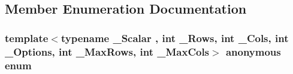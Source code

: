 \subsection{Member Enumeration Documentation}
\hypertarget{structei__traits_3_01_matrix_3_01___scalar_00_01___rows_00_01___cols_00_01___options_00_01___max42eca4acfde64c6129563dd143e7773e_abd2f016cad615ecfde4130fcf6345cf8}{\subsubsection[{anonymous enum}]{\setlength{\rightskip}{0pt plus 5cm}template$<$typename \-\_\-\-Scalar , int \-\_\-\-Rows, int \-\_\-\-Cols, int \-\_\-\-Options, int \-\_\-\-Max\-Rows, int \-\_\-\-Max\-Cols$>$ anonymous enum}}\label{structei__traits_3_01_matrix_3_01___scalar_00_01___rows_00_01___cols_00_01___options_00_01___max42eca4acfde64c6129563dd143e7773e_abd2f016cad615ecfde4130fcf6345cf8}
